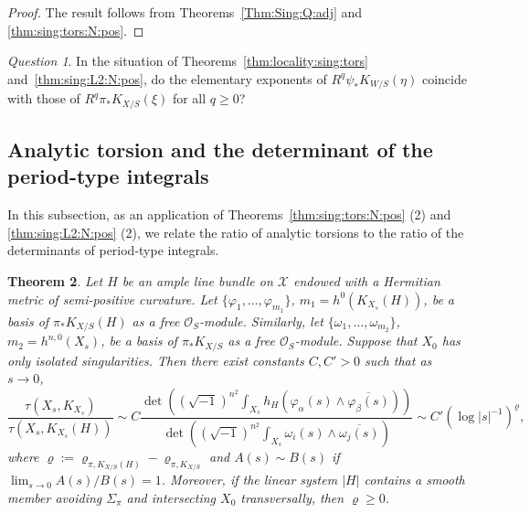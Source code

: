 \documentclass[amscd, leqno]{amsart}
\theoremstyle{plain}
\newtheorem{theorem}{Theorem}[section]
\theoremstyle{definition}
\theoremstyle{remark}
\newtheorem{question}[theorem]{Question}
\newenvironment{pf}{\begin{proof}}{\end{proof}}
\begin{document}
\begin{pf}
The result follows from Theorems~\ref{Thm:Sing:Q:adj} and \ref{thm:sing:tors:N:pos}.
\end{pf}


\begin{question}
In the situation of Theorems~\ref{thm:locality:sing:tors} and~\ref{thm:sing:L2:N:pos}, 
do the elementary exponents of $R^{q}\psi_{*}K_{W/S}(\eta)$ coincide with those of $R^{q}\pi_{*}K_{X/S}(\xi)$ for all $q \geq 0$?
\end{question}




\subsection
{Analytic torsion and the determinant of the period-type integrals}
\label{sect:7.3}
\par
In this subsection, as an application of Theorems~\ref{thm:sing:tors:N:pos} (2) and \ref{thm:sing:L2:N:pos} (2), 
we relate the ratio of analytic torsions to the ratio of the determinants of period-type integrals.
\par


\begin{theorem}
\label{thm:McKean:Singer:prod}
Let $H$ be an ample line bundle on ${\mathcal X}$ endowed with a Hermitian metric of semi-positive curvature. 
Let $\{ \varphi_{1}, \ldots, \varphi_{m_{1}} \}$, $m_{1}=h^{0}(K_{X_{s}}(H))$, be a basis of $\pi_{*}K_{X/S}(H)$ 
as a free ${\mathcal O}_{S}$-module. 
Similarly, let $\{ \omega_{1}, \ldots, \omega_{m_{2}} \}$, $m_{2} = h^{n,0}(X_{s})$, be a basis of $\pi_{*}K_{X/S}$ 
as a free ${\mathcal O}_{S}$-module. 
Suppose that $X_{0}$ has only isolated singularities. Then there exist constants $C,C'>0$ such that as $s \to 0$,
\begin{equation}
\label{eqn:McKean:Singer:prod}
\frac{ \tau(X_{s},K_{X_{s}}) }{ \tau(X_{s},K_{X_{s}}(H)) } 
\sim 
C \frac{\displaystyle \det\left( (\sqrt{-1})^{n^{2}} \int_{X_{s}} h_{H}(\varphi_{\alpha}(s) \wedge \overline{\varphi_{\beta}(s)} ) \right) }
{\displaystyle \det\left( (\sqrt{-1})^{n^{2}} \int_{X_{s}} \omega_{i}(s) \wedge \overline{\omega_{j}(s)} \right) }
\sim
C' (\log |s|^{-1})^{\varrho},
\end{equation}
where $\varrho := \varrho_{\pi, K_{X/S}(H)} - \varrho_{\pi, K_{X/S}}$ and $A(s) \sim B(s)$ if $\lim_{s\to0} A(s)/B(s) =1$.
Moreover, if the linear system $|H|$ contains a smooth member avoiding $\Sigma_{\pi}$ and intersecting $X_{0}$ transversally,
then $\varrho \geq 0$.
\end{theorem}
\end{document}
